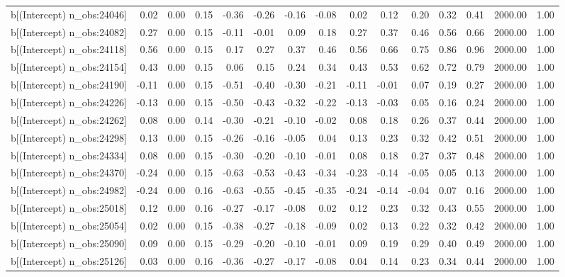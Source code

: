 \begin{table}[ht]
\begin{tabular}{rrrrrrrrrrrrrrr}
  b[(Intercept) n\_obs:24046] & 0.02 & 0.00 & 0.15 & -0.36 & -0.26 & -0.16 & -0.08 & 0.02 & 0.12 & 0.20 & 0.32 & 0.41 & 2000.00 & 1.00 \\ 
  b[(Intercept) n\_obs:24082] & 0.27 & 0.00 & 0.15 & -0.11 & -0.01 & 0.09 & 0.18 & 0.27 & 0.37 & 0.46 & 0.56 & 0.66 & 2000.00 & 1.00 \\ 
  b[(Intercept) n\_obs:24118] & 0.56 & 0.00 & 0.15 & 0.17 & 0.27 & 0.37 & 0.46 & 0.56 & 0.66 & 0.75 & 0.86 & 0.96 & 2000.00 & 1.00 \\ 
  b[(Intercept) n\_obs:24154] & 0.43 & 0.00 & 0.15 & 0.06 & 0.15 & 0.24 & 0.34 & 0.43 & 0.53 & 0.62 & 0.72 & 0.79 & 2000.00 & 1.00 \\ 
  b[(Intercept) n\_obs:24190] & -0.11 & 0.00 & 0.15 & -0.51 & -0.40 & -0.30 & -0.21 & -0.11 & -0.01 & 0.07 & 0.19 & 0.27 & 2000.00 & 1.00 \\ 
  b[(Intercept) n\_obs:24226] & -0.13 & 0.00 & 0.15 & -0.50 & -0.43 & -0.32 & -0.22 & -0.13 & -0.03 & 0.05 & 0.16 & 0.24 & 2000.00 & 1.00 \\ 
  b[(Intercept) n\_obs:24262] & 0.08 & 0.00 & 0.14 & -0.30 & -0.21 & -0.10 & -0.02 & 0.08 & 0.18 & 0.26 & 0.37 & 0.44 & 2000.00 & 1.00 \\ 
  b[(Intercept) n\_obs:24298] & 0.13 & 0.00 & 0.15 & -0.26 & -0.16 & -0.05 & 0.04 & 0.13 & 0.23 & 0.32 & 0.42 & 0.51 & 2000.00 & 1.00 \\ 
  b[(Intercept) n\_obs:24334] & 0.08 & 0.00 & 0.15 & -0.30 & -0.20 & -0.10 & -0.01 & 0.08 & 0.18 & 0.27 & 0.37 & 0.48 & 2000.00 & 1.00 \\ 
  b[(Intercept) n\_obs:24370] & -0.24 & 0.00 & 0.15 & -0.63 & -0.53 & -0.43 & -0.34 & -0.23 & -0.14 & -0.05 & 0.05 & 0.13 & 2000.00 & 1.00 \\ 
  b[(Intercept) n\_obs:24982] & -0.24 & 0.00 & 0.16 & -0.63 & -0.55 & -0.45 & -0.35 & -0.24 & -0.14 & -0.04 & 0.07 & 0.16 & 2000.00 & 1.00 \\ 
  b[(Intercept) n\_obs:25018] & 0.12 & 0.00 & 0.16 & -0.27 & -0.17 & -0.08 & 0.02 & 0.12 & 0.23 & 0.32 & 0.43 & 0.55 & 2000.00 & 1.00 \\ 
  b[(Intercept) n\_obs:25054] & 0.02 & 0.00 & 0.15 & -0.38 & -0.27 & -0.18 & -0.09 & 0.02 & 0.13 & 0.22 & 0.32 & 0.42 & 2000.00 & 1.00 \\ 
  b[(Intercept) n\_obs:25090] & 0.09 & 0.00 & 0.15 & -0.29 & -0.20 & -0.10 & -0.01 & 0.09 & 0.19 & 0.29 & 0.40 & 0.49 & 2000.00 & 1.00 \\ 
  b[(Intercept) n\_obs:25126] & 0.03 & 0.00 & 0.16 & -0.36 & -0.27 & -0.17 & -0.08 & 0.04 & 0.14 & 0.23 & 0.34 & 0.44 & 2000.00 & 1.00 \\ 

\end{tabular}
\end{table}
